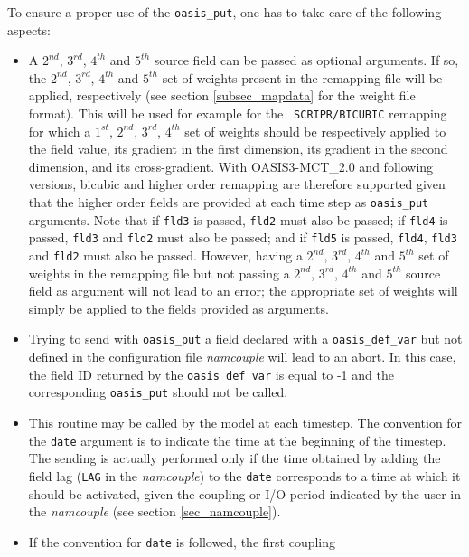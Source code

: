 To ensure a proper use of the {\tt oasis\_put}, one has to take care
of the following aspects:

\begin{itemize}

\item A $2^{nd}$, $3^{rd}$, $4^{th}$ and $5^{th}$ source field can be
  passed as optional arguments. If so, the $2^{nd}$, $3^{rd}$,
  $4^{th}$ and $5^{th}$ set of weights present in the remapping file
  will be applied, respectively (see section \ref{subsec_mapdata} for
  the weight file format). This will be used for example for the {\tt
    SCRIPR/BICUBIC} remapping for which a $1^{st}$, $2^{nd}$,
  $3^{rd}$, $4^{th}$ set of weights should be respectively applied to
  the field value, its gradient in the first dimension, its gradient
  in the second dimension, and its cross-gradient. With
  OASIS3-MCT\_2.0 and following versions, bicubic and higher order
  remapping are therefore supported given that the higher order fields
  are provided at each time step as {\tt oasis\_put} arguments. Note
  that if {\tt fld3} is passed, {\tt fld2} must also be passed; if
  {\tt fld4} is passed, {\tt fld3} and {\tt fld2} must also be passed;
  and if {\tt fld5} is passed, {\tt fld4}, {\tt fld3} and {\tt fld2}
  must also be passed. However, having a $2^{nd}$, $3^{rd}$, $4^{th}$
  and $5^{th}$ set of weights in the remapping file but not passing a
  $2^{nd}$, $3^{rd}$, $4^{th}$ and $5^{th}$ source field as argument
  will not lead to an error; the appropriate set of weights will
  simply be applied to the fields provided as arguments.
\item Trying to send with {\tt oasis\_put} a field declared with a
  {\tt oasis\_def\_var} but not defined in the configuration file {\it
    namcouple} will lead to an abort. In this case, the field ID
  returned by the {\tt oasis\_def\_var} is equal to -1 and the
  corresponding {\tt oasis\_put} should not be called.
\item This routine may be called by the model at each timestep. The
  convention for the {\tt date} argument is to indicate the time at
  the beginning of the timestep. The sending is actually performed
  only if the time obtained by adding the field lag ({\tt LAG} in the
  {\em namcouple}) to the {\tt date} corresponds to a time at which it
  should be activated, given the coupling or I/O period indicated by
  the user in the {\it namcouple} (see section \ref{sec_namcouple}).
\item If the convention for {\tt date} is followed, the first coupling

\end{itemize}
